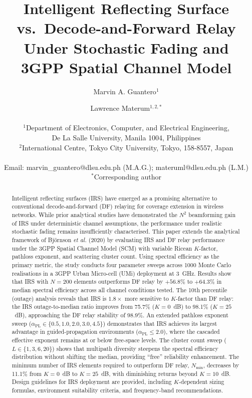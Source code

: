 \documentclass[journal]{IEEEtran} %
\begin{document}
\title{\Huge\textbf{Intelligent Reflecting Surface vs.\ Decode-and-Forward Relay Under Stochastic Fading and 3GPP Spatial Channel Model}}
\author{
Marvin A. Guantero$^{1}$ \and Lawrence Materum$^{1,2,*}$ \\
\\
$^{1}$Department of Electronics, Computer, and Electrical Engineering,\\
De La Salle University, Manila 1004, Philippines \\
$^{2}$International Centre, Tokyo City University, Tokyo, 158-8557, Japan \\
\\
Email: marvin\_guantero@dlsu.edu.ph (M.A.G.); materuml@dlsu.edu.ph (L.M.) \\
$^{*}$Corresponding author
}



\maketitle

\begin{abstract}
Intelligent reflecting surfaces (IRS) have emerged as a promising alternative to conventional decode-and-forward (DF) relaying for coverage extension in wireless networks. While prior analytical studies have demonstrated the $N^2$ beamforming gain of IRS under deterministic channel assumptions, the performance under realistic stochastic fading remains insufficiently characterised. This paper extends the analytical framework of Bj\"{o}rnson \textit{et al.} (2020) by evaluating IRS and DF relay performance under the 3GPP Spatial Channel Model (SCM) with variable Ricean $K$-factor, pathloss exponent, and scattering cluster count. Using spectral efficiency as the primary metric, the study conducts four parameter sweeps across 1000 Monte Carlo realisations in a 3GPP Urban Micro-cell (UMi) deployment at 3~GHz. Results show that IRS with $N = 200$ elements outperforms DF relay by $+56.8\%$ to $+64.3\%$ in median spectral efficiency across all channel conditions tested. The 10th percentile (outage) analysis reveals that IRS is $1.8\times$ more sensitive to $K$-factor than DF relay: the IRS outage-to-median ratio improves from 75.7\% ($K = 0$~dB) to 98.1\% ($K = 25$~dB), approaching the DF relay stability of 98.9\%. An extended pathloss exponent sweep ($\alpha_{\mathrm{PL}} \in \{0.5, 1.0, 2.0, 3.0, 4.5\}$) demonstrates that IRS achieves its largest advantage in guided-propagation environments ($\alpha_{\mathrm{PL}} \leq 2.0$), where the cascaded effective exponent remains at or below free-space levels. The cluster count sweep ($L \in \{1, 3, 6, 20\}$) shows that multipath diversity steepens the spectral efficiency distribution without shifting the median, providing ``free'' reliability enhancement. The minimum number of IRS elements required to outperform DF relay, $N_{\mathrm{min}}$, decreases by 11.1\% from $K = 0$~dB to $K = 25$~dB, with diminishing returns beyond $K = 10$~dB. Design guidelines for IRS deployment are provided, including $K$-dependent sizing formulas, environment suitability criteria, and frequency-band recommendations.
\end{abstract}
\end{document}

